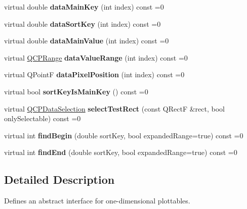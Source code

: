 \begin{DoxyCompactItemize}
virtual double {\bfseries data\+Main\+Key} (int index) const =0
\item 
\mbox{\label{class_q_c_p_plottable_interface1_d_aa21351ab3d6edbcf8d95f9c377e5003b}} 
virtual double {\bfseries data\+Sort\+Key} (int index) const =0
\item 
\mbox{\label{class_q_c_p_plottable_interface1_d_a17f6fbd78e004b6f3c8257fea50f9808}} 
virtual double {\bfseries data\+Main\+Value} (int index) const =0
\item 
\mbox{\label{class_q_c_p_plottable_interface1_d_af9a720ace6499337406a5e65d4823f57}} 
virtual \hyperlink{class_q_c_p_range}{Q\+C\+P\+Range} {\bfseries data\+Value\+Range} (int index) const =0
\item 
\mbox{\label{class_q_c_p_plottable_interface1_d_a35fd032c6e5226ff7b50e0f37c57922b}} 
virtual Q\+PointF {\bfseries data\+Pixel\+Position} (int index) const =0
\item 
\mbox{\label{class_q_c_p_plottable_interface1_d_acec8492c49e051aaec5ca5267900a98e}} 
virtual bool {\bfseries sort\+Key\+Is\+Main\+Key} () const =0
\item 
\mbox{\label{class_q_c_p_plottable_interface1_d_a05874ade11a735bb290bb96ccf7fdac1}} 
virtual \hyperlink{class_q_c_p_data_selection}{Q\+C\+P\+Data\+Selection} {\bfseries select\+Test\+Rect} (const Q\+RectF \&rect, bool only\+Selectable) const =0
\item 
\mbox{\label{class_q_c_p_plottable_interface1_d_ac8f224af7f2afeed46d82368344d8d9e}} 
virtual int {\bfseries find\+Begin} (double sort\+Key, bool expanded\+Range=true) const =0
\item 
\mbox{\label{class_q_c_p_plottable_interface1_d_a2a6f8cad846ea18d3ab46a95047de681}} 
virtual int {\bfseries find\+End} (double sort\+Key, bool expanded\+Range=true) const =0
\end{DoxyCompactItemize}


\subsection{Detailed Description}
Defines an abstract interface for one-\/dimensional plottables. 

